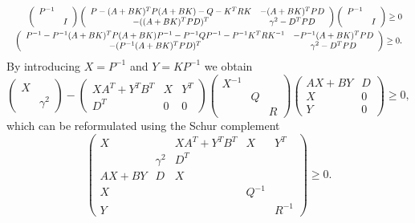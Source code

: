 \begin{equation}\Resize{\begin{split}
	\left(\begin{array}{cc}
	P^{-1} &  \\  & I
	\end{array}\right)
	\left(\begin{array}{cc}
	P - (A+BK)^T P (A+BK) - Q - K^T R K & -(A+BK)^T P D \\
	- ((A+BK)^T P D)^T & \gamma^2 - D^T P D
	\end{array}\right)
	\left(\begin{array}{cc}
	P^{-1} &  \\  & I
	\end{array}\right) \geq 0\\
	\left(\begin{array}{cc}
	P^{-1} - P^{-1}(A+BK)^T P (A+BK)P^{-1} - P^{-1}QP^{-1} - P^{-1}K^T R K^{-1} & -P^{-1}(A+BK)^T P D \\
	- (P^{-1}(A+BK)^T P D)^T & \gamma^2 - D^T P D
	\end{array}\right)\geq 0.
\end{split}}\end{equation}
%
By introducing $X=P^{-1}$ and $Y = K P^{-1}$ we obtain
%
\begin{equation}
	\left(\begin{array}{cc}
	X & \\ & \gamma^2
	\end{array}\right)
	-\left(\begin{array}{ccc}
	XA^T + Y^T B^T & X & Y^T \\
	D^T & 0 & 0
	\end{array}\right)
	\left(\begin{array}{ccc}
	X^{-1} & & \\
	& Q & \\
	& & R
	\end{array}\right)
	\left(\begin{array}{cc}
	AX + BY & D \\
	X & 0 \\
	Y & 0
	\end{array}\right) \geq 0,
\end{equation}
%
which can be reformulated using the Schur complement
%
\begin{equation}\label{app:eq:SDP:for:terminal:controller}
	\left(\begin{array}{cc|ccc}
	X & & XA^T + Y^T B^T & X & Y^T \\
	 & \gamma^2 & D^T & & \\ \hline
	 AX + BY & D & X & & \\
	 X & & & Q^{-1} & \\
	 Y & & & & R^{-1}
	\end{array}\right) \geq 0.
\end{equation}
